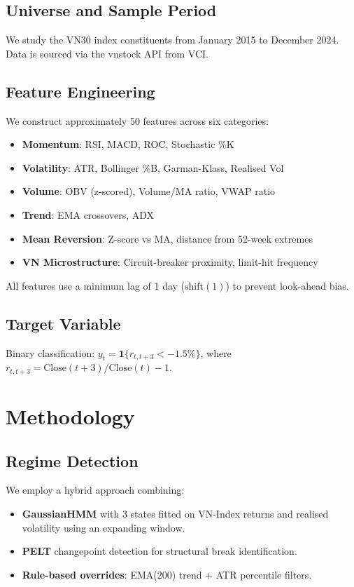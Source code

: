 \documentclass[12pt,a4paper]{article}
\begin{document}
\subsection{Universe and Sample Period}
We study the VN30 index constituents from January 2015 to December 2024.
Data is sourced via the vnstock API from VCI.

\subsection{Feature Engineering}
We construct approximately 50 features across six categories:
\begin{itemize}
    \item \textbf{Momentum}: RSI, MACD, ROC, Stochastic \%K
    \item \textbf{Volatility}: ATR, Bollinger \%B, Garman-Klass, Realised Vol
    \item \textbf{Volume}: OBV (z-scored), Volume/MA ratio, VWAP ratio
    \item \textbf{Trend}: EMA crossovers, ADX
    \item \textbf{Mean Reversion}: Z-score vs MA, distance from 52-week extremes
    \item \textbf{VN Microstructure}: Circuit-breaker proximity, limit-hit frequency
\end{itemize}

All features use a minimum lag of 1 day ($\text{shift}(1)$) to prevent
look-ahead bias.

\subsection{Target Variable}
Binary classification: $y_t = \mathbf{1}\{r_{t,t+3} < -1.5\%\}$, where
$r_{t,t+3} = \text{Close}(t+3)/\text{Close}(t) - 1$.

\section{Methodology}
\label{sec:method}

\subsection{Regime Detection}
We employ a hybrid approach combining:
\begin{itemize}
    \item \textbf{GaussianHMM} with 3 states fitted on VN-Index returns and
          realised volatility using an expanding window.
    \item \textbf{PELT} changepoint detection for structural break identification.
    \item \textbf{Rule-based overrides}: EMA(200) trend + ATR percentile filters.
\end{itemize}
\end{document}
